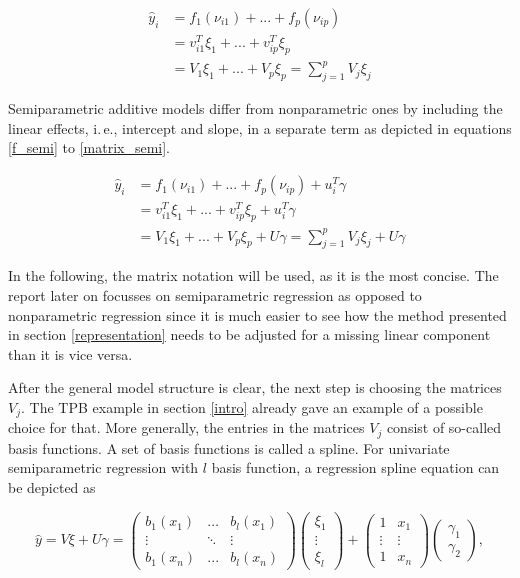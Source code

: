 \documentclass[12pt]{article}
\begin{document}
\begin{align}
\hat{y}_i &= f_1(\nu_{i1}) + ... + f_p(\nu_{ip})\label{f}\\
&=  v^T_{i1}\xi_1 + ... + v^T_{ip}\xi_p\label{vector} \\
&= V_1\xi_1 + ... + V_p\xi_p = \sum_{j=1}^p V_j\xi_j \label{matrix}
\end{align}

Semiparametric additive models differ from nonparametric ones by including the linear effects, i.\,e., intercept and slope, in a separate term as depicted in equations \ref{f_semi} to \ref{matrix_semi}.

\begin{align}
\hat{y}_i &= f_1(\nu_{i1}) + ... + f_p(\nu_{ip})+ u^T_i\gamma\label{f_semi}\\
&=  v^T_{i1}\xi_1 + ... + v^T_{ip}\xi_p+ u^T_i\gamma\label{vector_semi} \\
&= V_1\xi_1 + ... + V_p\xi_p + U\gamma= \sum_{j=1}^p V_j\xi_j + U\gamma\label{matrix_semi}
\end{align}

In the following, the matrix notation will be used, as it is the most concise.
The report later on focusses on semiparametric regression as opposed to nonparametric regression since it is much easier to see how the method presented in section \ref{representation} needs to be adjusted for a missing linear component than it is vice versa.

After the general model structure is clear, the next step is choosing the matrices $V_j$.
The TPB example in section \ref{intro} already gave an example of a possible choice for that. More generally, the entries in the matrices $V_j$ consist of so-called basis functions. A set of basis functions is called a spline. For univariate semiparametric regression with $l$ basis function, a regression spline equation can be depicted as   

$$\hat{y} = V\xi + U\gamma 
= \begin{pmatrix}
b_1(x_1) & \dots & b_l(x_1) \\
 \vdots  & \ddots & \vdots \\
b_1(x_n) & ... & b_l(x_n)
\end{pmatrix} 
\begin{pmatrix}
\xi_1 \\
 \vdots   \\
\xi_l 
\end{pmatrix} 
+ 
\begin{pmatrix}
1 &  x_1 \\
 \vdots & \vdots \\
1 & x_n
\end{pmatrix} 
\begin{pmatrix}
\gamma_1 \\
\gamma_2 
\end{pmatrix},
$$
\end{document}
